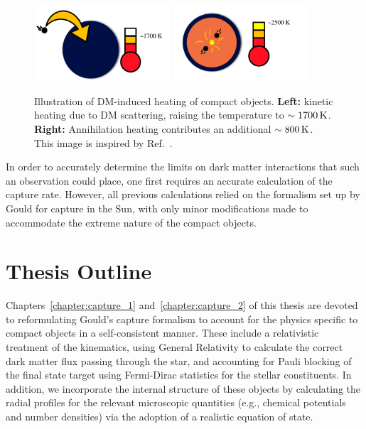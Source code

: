 \begin{figure}[!t]
    \centering
    \includegraphics[width=0.45\textwidth]{img/chapter_1/kin_heat_NS.pdf}
    \includegraphics[width=0.45\textwidth]{img/chapter_1/ann_heat_NS.pdf}
    \caption{Illustration of DM-induced heating of compact objects. \textbf{Left:} kinetic heating due to DM scattering, raising the temperature to $\sim 1700 {\rm \,K}$. \textbf{Right:} Annihilation heating contributes an additional $\sim 800{\rm \,K}$. This image is inspired by Ref.~\cite{Raj:2017wrv_feb_Neutronstarsdark}.}
    \label{fig:cartoon_NS_heat}
\end{figure}

In order to accurately determine the limits on dark matter interactions that such an observation could place, one first requires an accurate calculation of the capture rate. However, all previous calculations relied on the formalism set up by Gould for capture in the Sun, with only minor modifications made to accommodate the extreme nature of the compact objects. 

\section{Thesis Outline}

Chapters~\ref{chapter:capture_1} and~\ref{chapter:capture_2} of this thesis are devoted to reformulating Gould's capture formalism to account for the physics specific to compact objects in a self-consistent manner. These include a relativistic treatment of the kinematics, using General Relativity to calculate the correct dark matter flux passing through the star, and accounting for Pauli blocking of the final state target using Fermi-Dirac statistics for the stellar constituents. In addition, we incorporate the internal structure of these objects by calculating the radial profiles for the relevant microscopic quantities (e.g., chemical potentials and number densities) via the adoption of a realistic equation of state.

